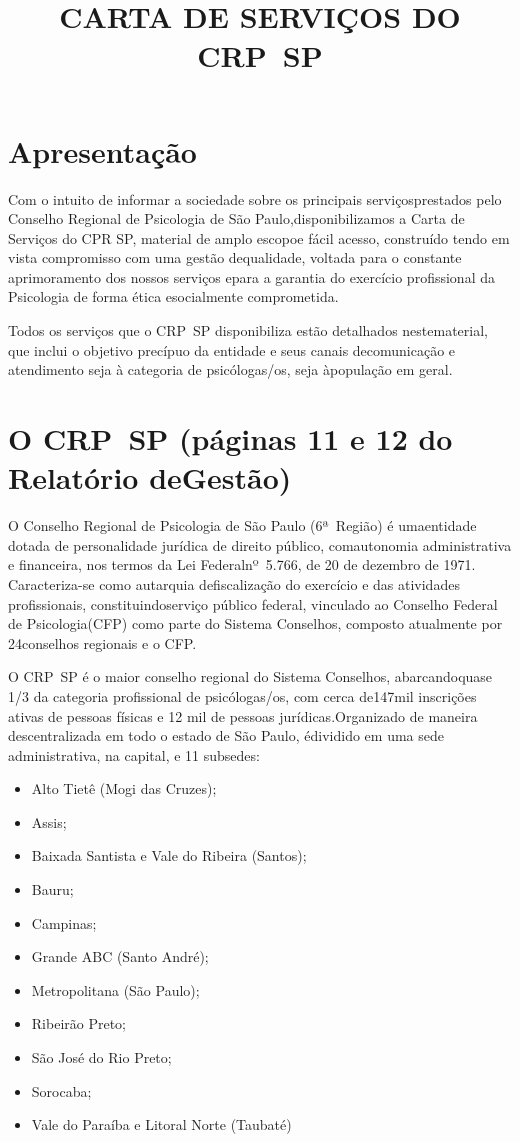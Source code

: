 \title{CARTA DE SERVIÇOS DO CRP~SP}\author{}\date{}

\maketitle

\section{Apresentação}

Com o intuito de informar a sociedade sobre os principais serviçosprestados pelo Conselho Regional de Psicologia de São Paulo,disponibilizamos a Carta de Serviços do CPR SP, material de amplo escopoe fácil acesso, construído tendo em vista compromisso com uma gestão dequalidade, voltada para o constante aprimoramento dos nossos serviços epara a garantia do exercício profissional da Psicologia de forma ética esocialmente comprometida.

Todos os serviços que o CRP~SP disponibiliza estão detalhados nestematerial, que inclui o objetivo precípuo da entidade e seus canais decomunicação e atendimento seja à categoria de psicólogas/os, seja àpopulação em geral.

\section{O CRP~SP (páginas 11 e 12 do Relatório deGestão)}

O Conselho Regional de Psicologia de São Paulo (6ª~Região) é umaentidade dotada de personalidade jurídica de direito público, comautonomia administrativa e financeira, nos termos da Lei Federalnº~5.766, de 20 de dezembro de 1971. Caracteriza-se como autarquia defiscalização do exercício e das atividades profissionais, constituindoserviço público federal, vinculado ao Conselho Federal de Psicologia(CFP) como parte do Sistema Conselhos, composto atualmente por 24conselhos regionais e o CFP.

O CRP~SP é o maior conselho regional do Sistema Conselhos, abarcandoquase 1/3 da categoria profissional de psicólogas/os, com cerca de147mil inscrições ativas de pessoas físicas e 12 mil de pessoas jurídicas.Organizado de maneira descentralizada em todo o estado de São Paulo, édividido em uma sede administrativa, na capital, e 11 subsedes:

\begin{itemize}
  \item  Alto Tietê (Mogi das Cruzes);
  \item  Assis;
  \item  Baixada Santista e Vale do Ribeira (Santos);
  \item  Bauru;
  \item  Campinas;
  \item  Grande ABC (Santo André);
  \item  Metropolitana (São Paulo);
  \item  Ribeirão Preto;
  \item  São José do Rio Preto;
  \item  Sorocaba;
  \item  Vale do Paraíba e Litoral Norte (Taubaté)
\end{itemize}

